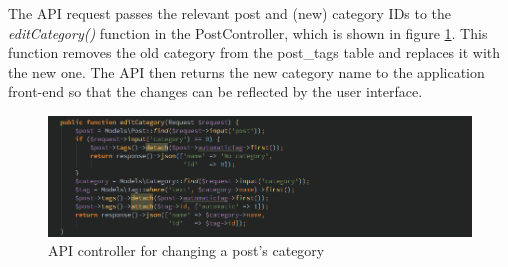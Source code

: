 The API request passes the relevant post and (new) category IDs to the \textit{editCategory()} function in the PostController, which is shown in figure \ref{fig:edit-category}. This function removes the old category from the post\_tags table and replaces it with the new one. The API then returns the new category name to the application front-end so that the changes can be reflected by the user interface. 

\begin{figure}[H]
\centering
\includegraphics[width=\textwidth]{Images/Implementation/edit-category}
\caption{API controller for changing a post's category}
\label{fig:edit-category}
\end{figure}


